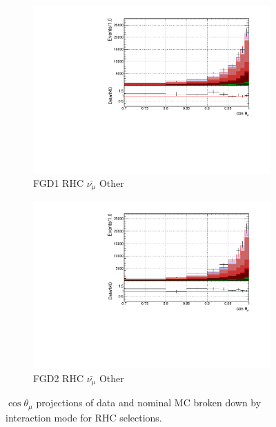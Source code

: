\begin{figure}[!h]
\begin{subfigure}{0.49\textwidth}
  \centering
  \includegraphics[width=\textwidth]{figs/FGD1_anti-numuCC_other_t}
  \caption{FGD1 RHC $\bar{\nu_{\mu}}$ Other}
\end{subfigure}
\begin{subfigure}{0.49\textwidth}
  \centering
  \includegraphics[width=\textwidth]{figs/FGD2_anti-numuCC_other_t}
  \caption{FGD2 RHC $\bar{\nu_{\mu}}$ Other}
\end{subfigure}
\caption{$\cos\theta_{\mu}$ projections of data and nominal MC broken down by interaction mode for RHC \numub selections.}
\label{fig:tstack_rhc_numub}
\end{figure}

